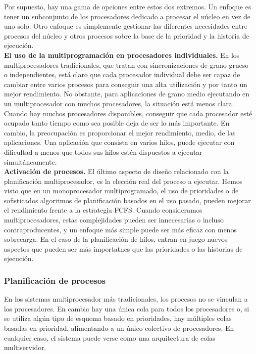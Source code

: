 \documentclass{article}
\begin{document}
					Por supuesto, hay una gama de opciones entre estos dos extremos. Un enfoque es tener un subconjunto de los procesadores dedicado a procesar el núcleo en vez de uno solo. Otro enfoque es simplemente gestionar las diferentes necesidades entre procesos del núcleo y otros procesos sobre la base de la prioridad y la historia de ejecución. \\
					
					\textbf{El uso de la multiprogramación en procesadores individuales.} En los multiprocesadores tradicionales, que tratan con sincronizaciones de grano grueso o independientes, está claro que cada procesador individual debe ser capaz de cambiar entre varios procesos para conseguir una alta utilización y por tanto un mejor rendimiento. No obstante, para aplicaciones de grano medio ejecutando en un multiprocesador con muchos procesadores, la situación está menos clara. Cuando hay muchos procesadores disponibles, conseguir que cada procesador esté ocupado tanto tiempo como sea posible deja de ser lo más importante. En cambio, la
preocupación es proporcionar el mejor rendimiento, medio, de las aplicaciones. Una aplicación que consista en varios hilos, puede ejecutar con dificultad a menos que todos sus hilos estén dispuestos a ejecutar simultáneamente. \\
					
					\textbf{Activación de procesos.} El último aspecto de diseño relacionado con la planificación multiprocesador, es la elección real del proceso a ejecutar. Hemos visto que en un monoprocesador multiprogramado, el uso de prioridades o de sofisticados algoritmos de planificación basodos en el uso pasado, pueden mejorar el rendimiento frente a la estrategia FCFS. Cuando consideramos multiprocesadores, estas complejidades pueden ser innecesarias o incluso contraproducentes, y un enfoque más simple puede ser más eficaz con menos sobrecarga. En el caso de la planificación de hilos, entran en juego nuevos aspectos que pueden ser más importatnes que las prioridades o las historias de ejecución. 
					
				\subsubsection{Planificación de procesos}
					En los sistemas multiprocesador más tradicionales, los procesos no se vinculan a los procesadores. En cambio hay una única cola para todos los procesadores o, si se utiliza algún tipo de esquema basado en prioridades, hay múltiples colas basadas en prioridad, alimentando a un único colectivo de procesadores. En cualquier caso, el sistema puede verse como una arquitectura de colas multiservidor. \\
					
\end{document}
